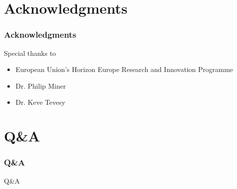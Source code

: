 \documentclass{beamer}
\begin{document}
\section{Acknowledgments}
\begin{frame}
\frametitle{Acknowledgments}
Special thanks to
\begin{itemize}
    \item European Union's Horizon Europe Research and Innovation Programme
    \item Dr. Philip Miner
    \item Dr. Keve Tevesy
\end{itemize}
\end{frame}

\section{Q\&A}
\begin{frame}
\frametitle{Q\&A}
Q\&A
\end{frame}
\end{document}
